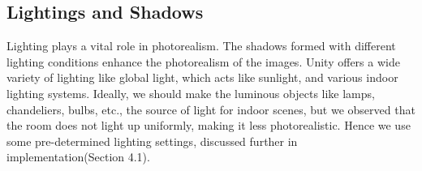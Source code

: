 \subsection{Lightings and Shadows}\label{subsec:lightings-and-shadows}

Lighting plays a vital role in photorealism.
The shadows formed with different lighting conditions enhance the photorealism of the images.
Unity offers a wide variety of lighting like global light, which acts like sunlight, and various indoor lighting systems.
Ideally, we should make the luminous objects like lamps, chandeliers, bulbs, etc.,
the source of light for indoor scenes, but we observed that the room does not light up uniformly, making it less photorealistic.
Hence we use some pre-determined lighting settings, discussed further in implementation(Section 4.1).


